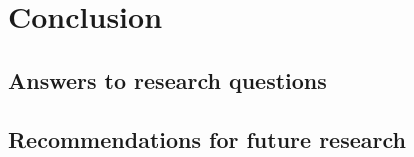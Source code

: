 \chapter{Conclusion}

\section{Answers to research questions}

\section{Recommendations for future research}
